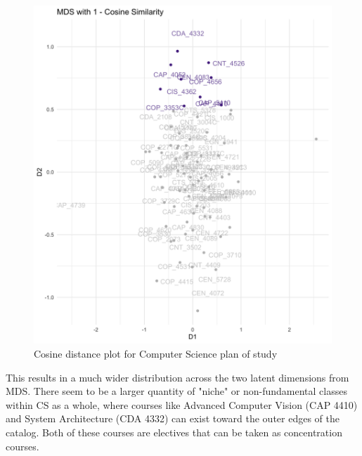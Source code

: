 \begin{figure}[H]
  \centering
  
  \includegraphics[width = .8\textwidth, height = .7\textheight]{Content/images/cos_mds_cs.png}
  \caption{Cosine distance plot for Computer Science plan of study}
  \label{fig:cmds_cs}
\end{figure}

This results in a much wider distribution across the two latent dimensions from MDS. There seem to be a larger quantity of 
"niche" or non-fundamental classes within CS as a whole, where courses like Advanced Computer Vision (CAP 4410) and 
System Architecture (CDA 4332) can exist toward the outer edges of the catalog. Both of these courses are electives that can be taken 
as concentration courses. 
